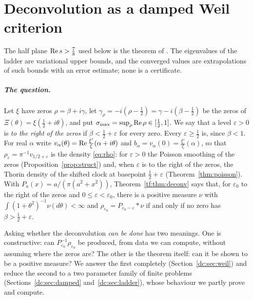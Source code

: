 \chapter{Deconvolution as a damped Weil criterion}\label{chap:dc}

The half plane $\operatorname{Re} s>\frac78$ used below is the theorem of \cite{OAI26a}. The eigenvalues of the ladder are variational upper bounds, and the converged values are extrapolations of such bounds with an error estimate; none is a certificate.

\paragraph{The question.}\label{dc:sec:question} Let $\xi$ have zeros $\rho=\beta+i\gamma$, let $\gamma_\rho=-i(\rho-\frac12)=\gamma-i(\beta-\frac12)$ be the zeros of $\Xi(\theta)=\xi(\frac12+i\theta)$, and put $\sigma_{\max}=\sup_\rho\operatorname{Re}\rho\in[\frac12,1]$. We say that a level $\varepsilon>0$ is \emph{to the right of the zeros} if $\beta<\frac12+\varepsilon$ for every zero. Every $\varepsilon\ge\frac12$ is, since $\beta<1$. For real $\alpha$ write $v_\alpha(\theta)=\operatorname{Re}\frac{\xi'}{\xi}(\alpha+i\theta)$ and $b_\alpha=v_\alpha(0)=\frac{\xi'}{\xi}(\alpha)$, so that $\rho_\varepsilon=\pi^{-1}v_{1/2+\varepsilon}$ is the density \eqref{eq:rho}: for $\varepsilon>0$ the Poisson smoothing of the zeros (Proposition~\ref{prop:struct}) and, when $\varepsilon$ is to the right of the zeros, the Thorin density of the shifted clock at basepoint $\frac12+\varepsilon$ (Theorem~\ref{thm:poisson}). With $P_a(x)=a/(\pi(a^2+x^2))$, Theorem~\ref{tf:thm:deconv} says that, for $\varepsilon_0$ to the right of the zeros and $0\le\varepsilon<\varepsilon_0$, there is a positive measure $\nu$ with $\int(1+\theta^2)^{-1}\nu(d\theta)<\infty$ and $\rho_{\varepsilon_0}=P_{\varepsilon_0-\varepsilon}*\nu$ if and only if no zero has $\beta>\frac12+\varepsilon$.

Asking whether the deconvolution \emph{can be done} has two meanings. One is constructive: can $P_{\varepsilon_0}^{-1}\rho_{\varepsilon_0}$ be produced, from data we can compute, without assuming where the zeros are? The other is the theorem itself: can it be shown to be a positive measure? We answer the first completely (Section~\ref{dc:sec:weil}) and reduce the second to a two parameter family of finite problems (Sections~\ref{dc:sec:damped} and~\ref{dc:sec:ladder}), whose behaviour we partly prove and compute.
